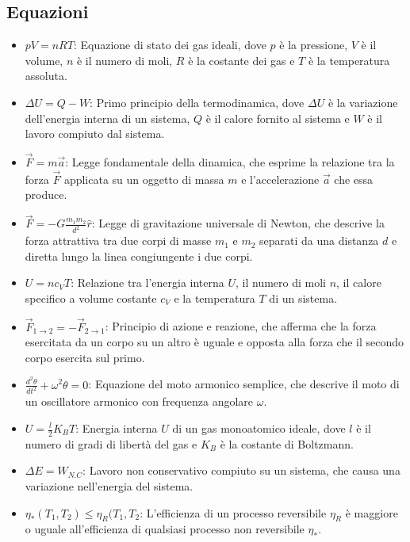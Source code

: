 \documentclass{article}
\begin{document}
\subsection{Equazioni}
\begin{itemize}
    \item \(pV = nRT\): Equazione di stato dei gas ideali, dove \(p\) è la pressione, \(V\) è il volume, \(n\) è il numero di moli, \(R\) è la costante dei gas e \(T\) è la temperatura assoluta.
    \item \(\Delta U = Q - W\): Primo principio della termodinamica, dove \(\Delta U\) è la variazione dell'energia interna di un sistema, \(Q\) è il calore fornito al sistema e \(W\) è il lavoro compiuto dal sistema.
    \item \( \Vec{F} = m \Vec{a}\): Legge fondamentale della dinamica, che esprime la relazione tra la forza \(\vec{F}\) applicata su un oggetto di massa \(m\) e l'accelerazione \(\vec{a}\) che essa produce.
    \item \(\Vec{F} = -G \frac{m_1m_2}{d^2} \hat{r}\): Legge di gravitazione universale di Newton, che descrive la forza attrattiva tra due corpi di masse \(m_1\) e \(m_2\) separati da una distanza \(d\) e diretta lungo la linea congiungente i due corpi.
    \item \(U = n c_V T\): Relazione tra l'energia interna \(U\), il numero di moli \(n\), il calore specifico a volume costante \(c_V\) e la temperatura \(T\) di un sistema.
    \item \(\Vec{F}_{1\rightarrow 2}   = - \Vec{F}_{2\rightarrow 1}\): Principio di azione e reazione, che afferma che la forza esercitata da un corpo su un altro è uguale e opposta alla forza che il secondo corpo esercita sul primo.
    \item \( \frac{d^2 \theta}{dt^2} + \omega ^ 2\theta = 0\): Equazione del moto armonico semplice, che descrive il moto di un oscillatore armonico con frequenza angolare \(\omega\).
    \item \( U = \frac{l}{2}K_BT\): Energia interna \(U\) di un gas monoatomico ideale, dove \(l\) è il numero di gradi di libertà del gas e \(K_B\) è la costante di Boltzmann.
    \item \( \Delta E = W_{N.C}\): Lavoro non conservativo compiuto su un sistema, che causa una variazione nell'energia del sistema.
    \item \( \eta_{*}(T_1,T_2) \leq \eta _R (T_1,T_2 \): L'efficienza di un processo reversibile \(\eta_R\) è maggiore o uguale all'efficienza di qualsiasi processo non reversibile \(\eta_*\).

\end{itemize}
\end{document}
